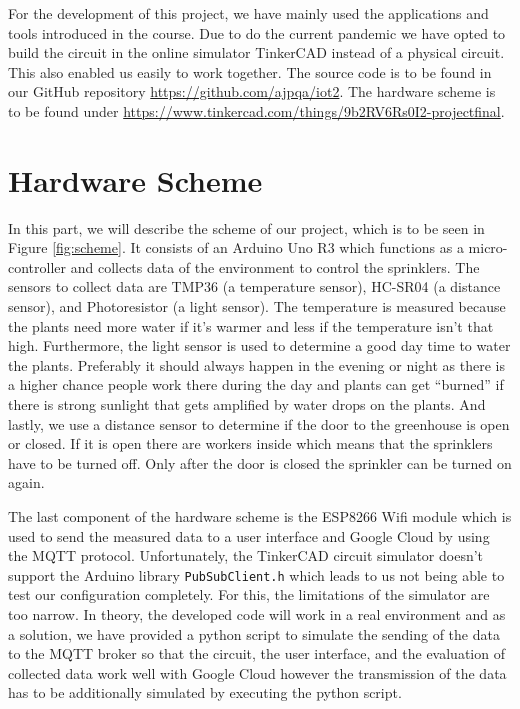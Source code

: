 \documentclass{article}
\begin{document}
For the development of this project, we have mainly used the applications and tools introduced in the course. Due to do the current pandemic we have opted to build the circuit in the online simulator TinkerCAD instead of a physical circuit. This also enabled us easily to work together. The source code is to be found in our GitHub repository \url{https://github.com/ajpqa/iot2}. The hardware scheme is to be found under \url{https://www.tinkercad.com/things/9b2RV6Rs0I2-projectfinal}.
\section{Hardware Scheme}
In this part, we will describe the scheme of our project, which is to be seen in Figure \ref{fig:scheme}. It consists of an Arduino Uno R3 which functions as a micro-controller and collects data of the environment to control the sprinklers. The sensors to collect data are TMP36 (a temperature sensor), HC-SR04 (a distance sensor), and Photoresistor (a light sensor). The temperature is measured because the plants need more water if it's warmer and less if the temperature isn't that high. Furthermore, the light sensor is used to determine a good day time to water the plants. Preferably it should always happen in the evening or night as there is a higher chance people work there during the day and plants can get \enquote{burned} if there is strong sunlight that gets amplified by water drops on the plants. And lastly, we use a distance sensor to determine if the door to the greenhouse is open or closed. If it is open there are workers inside which means that the sprinklers have to be turned off. Only after the door is closed the sprinkler can be turned on again.\par
The last component of the hardware scheme is the ESP8266 Wifi module which is used to send the measured data to a user interface and Google Cloud by using the MQTT protocol. Unfortunately, the TinkerCAD circuit simulator doesn't support the Arduino library \texttt{PubSubClient.h} which leads to us not being able to test our configuration completely. For this, the limitations of the simulator are too narrow. In theory, the developed code will work in a real environment and as a solution, we have provided a python script to simulate the sending of the data to the MQTT broker so that the circuit, the user interface, and the evaluation of collected data work well with Google Cloud however the transmission of the data has to be additionally simulated by executing the python script.
\end{document}

